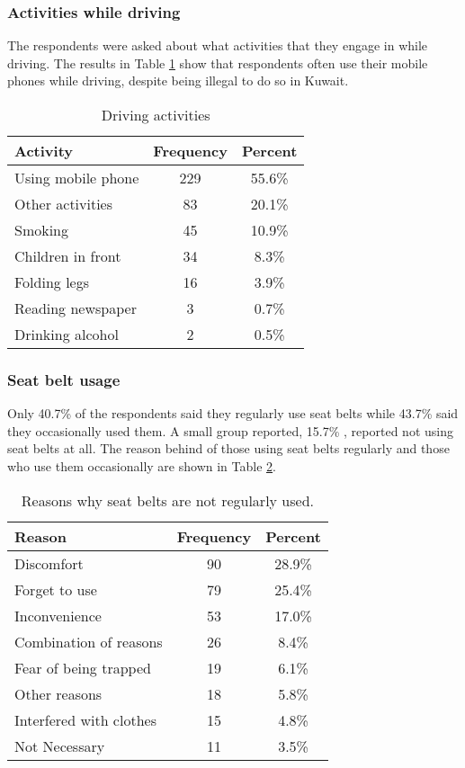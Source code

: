 \documentclass[preprint,12pt,a4paper,authoryear]{elsarticle}
\begin{document}
\begin{linenumbers}
\subsubsection{Activities while driving}
The respondents were asked about what activities that they engage in while driving. The results in Table \ref{tab:activities} show that respondents often use their mobile phones while driving, despite being illegal to do so in Kuwait.

\begin{table}[H]
\centering
\caption{Driving activities}
\label{tab:activities}
\begin{tabular}{@{}lcc@{}}
\toprule
\textbf{Activity} & \textbf{Frequency} & \textbf{Percent} \\ \midrule
Using mobile phone & 229 & 55.6\% \\
Other activities & 83 & 20.1\% \\
Smoking & 45 & 10.9\% \\
Children in front & 34 & 8.3\% \\
Folding legs & 16 & 3.9\% \\
Reading newspaper & 3 & 0.7\% \\
Drinking alcohol & 2 & 0.5\% \\ \bottomrule
\end{tabular}
\end{table}

\subsubsection{Seat belt usage}
Only 40.7\% of the respondents said they regularly use seat belts while 43.7\% said they occasionally used them. A small group reported, 15.7\% , reported not using seat belts at all. The reason behind of those using seat belts regularly  and those who use them occasionally  are shown in Table \ref{tab:excuses}. 

\begin{table}[H]
\centering
\caption{Reasons why seat belts are not regularly used.}
\label{tab:excuses}
\begin{tabular}{@{}lcc@{}}
\toprule
\textbf{Reason} & \textbf{Frequency} & \textbf{Percent} \\ \midrule
Discomfort & 90 & 28.9\% \\
Forget to use & 79 & 25.4\% \\
Inconvenience & 53 & 17.0\% \\
Combination of reasons & 26 & 8.4\% \\
Fear of being trapped & 19 & 6.1\% \\
Other reasons & 18 & 5.8\% \\
Interfered with clothes & 15 & 4.8\% \\
Not Necessary & 11 & 3.5\% \\ \bottomrule
\end{tabular}
\end{table}


\end{linenumbers}
\end{document}
